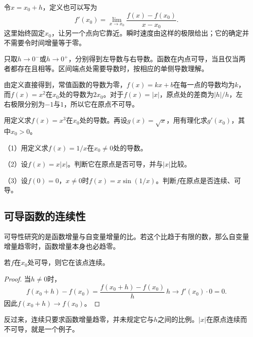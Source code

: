 令\(x=x_0+h\)，定义也可以写为
\begin{equation*}
 f'(x_0)=\lim_{x\to x_0}\frac{f(x)-f(x_0)}{x-x_0}.
\end{equation*}
这里始终固定\(x_0\)，让另一个点向它靠近。瞬时速度由这样的极限给出；它的确定并不需要令时间增量等于零。

只取\(h\to0^-\)或\(h\to0^+\)，分别得到左导数与右导数。函数在内点可导，当且仅当两者都存在且相等。区间端点处需要导数时，按相应的单侧导数理解。

由定义直接得到，常值函数的导数为零，\(f(x)=kx+b\)在每一点的导数均为\(k\)，而\(f(x)=x^2\)在\(x_0\)处的导数为\(2x_0\)。对于\(f(x)=|x|\)，原点处的差商为\(|h|/h\)，左右极限分别为\(-1\)与\(1\)，所以它在原点不可导。

\begin{example}
用定义求\(f(x)=x^3\)在\(x_0\)处的导数。再设\(g(x)=\sqrt{x}\)，用有理化求\(g'(x_0)\)，其中\(x_0>0\)。
\end{example}

\begin{exercise}
\mbox{}\par\nobreak

（1）用定义求\(f(x)=1/x\)在\(x_0\ne0\)处的导数。

（2）设\(f(x)=x|x|\)。判断它在原点是否可导，并与\(|x|\)比较。

（3）设\(f(0)=0\)，\(x\ne0\)时\(f(x)=x\sin(1/x)\)。判断\(f\)在原点是否连续、可导。
\end{exercise}

\subsection{可导函数的连续性}

可导性研究的是函数增量与自变量增量的比。若这个比趋于有限的数，那么自变量增量趋零时，函数增量本身也必趋零。

\begin{theorem}\label{thm:calculus-differentiable-continuous}
若\(f\)在\(x_0\)处可导，则它在该点连续。
\end{theorem}

\begin{proof}
当\(h\ne0\)时，
\begin{equation*}
 f(x_0+h)-f(x_0)=\frac{f(x_0+h)-f(x_0)}h\,h\longrightarrow f'(x_0)\cdot0=0.
\end{equation*}
因此\(f(x_0+h)\to f(x_0)\)。
\end{proof}

反过来，连续只要求函数增量趋零，并未规定它与\(h\)之间的比例。\(|x|\)在原点连续而不可导，就是一个例子。

